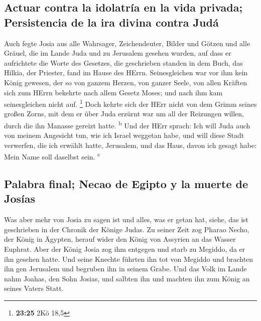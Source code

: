 \hypertarget{actuar-contra-la-idolatruxeda-en-la-vida-privada-persistencia-de-la-ira-divina-contra-juduxe1}{%
\subsection{Actuar contra la idolatría en la vida privada; Persistencia
de la ira divina contra
Judá}\label{actuar-contra-la-idolatruxeda-en-la-vida-privada-persistencia-de-la-ira-divina-contra-juduxe1}}

 Auch fegte Josia aus alle Wahrsager, Zeichendeuter,
Bilder und Götzen und alle Gräuel, die im Lande Juda und zu Jerusalem
gesehen wurden, auf dass er aufrichtete die Worte des Gesetzes, die
geschrieben standen in dem Buch, das Hilkia, der Priester, fand im Hause
des HErrn.  Seinesgleichen war vor ihm kein König
gewesen, der so von ganzem Herzen, von ganzer Seele, von allen Kräften
sich zum HErrn bekehrte nach allem Gesetz Moses; und nach ihm kam
seinesgleichen nicht auf. \footnote{\textbf{23:25} 2Kö 18,5}
 Doch kehrte sich der HErr nicht von dem Grimm seines
großen Zorns, mit dem er über Juda erzürnt war um all der Reizungen
willen, durch die ihn Manasse gereizt hatte. \textsuperscript{b}
 Und der HErr sprach: Ich will Juda auch von meinem
Angesicht tun, wie ich Israel weggetan habe, und will diese Stadt
verwerfen, die ich erwählt hatte, Jerusalem, und das Haus, davon ich
gesagt habe: Mein Name soll daselbst sein. \textsuperscript{c}

\hypertarget{palabra-final-necao-de-egipto-y-la-muerte-de-josuxedas}{%
\subsection{Palabra final; Necao de Egipto y la muerte de
Josías}\label{palabra-final-necao-de-egipto-y-la-muerte-de-josuxedas}}

 Was aber mehr von Josia zu sagen ist und alles, was er
getan hat, siehe, das ist geschrieben in der Chronik der Könige Judas.
 Zu seiner Zeit zog Pharao Necho, der König in Ägypten,
herauf wider den König von Assyrien an das Wasser Euphrat. Aber der
König Josia zog ihm entgegen und starb zu Megiddo, da er ihn gesehen
hatte.  Und seine Knechte führten ihn tot von Megiddo und
brachten ihn gen Jerusalem und begruben ihn in seinem Grabe. Und das
Volk im Lande nahm Joahas, den Sohn Josias, und salbten ihn und machten
ihn zum König an seines Vaters Statt.

